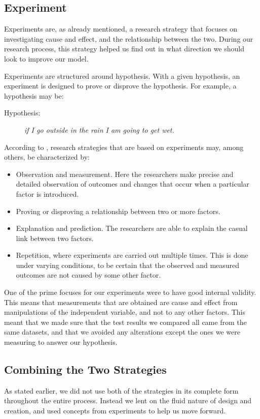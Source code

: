\subsection{Experiment}
\label{sec:experiment}
Experiments are, as already mentioned, a research strategy that focuses on investigating cause and effect, and the relationship between the two. During our research process, this strategy helped us find out in what direction we should look to improve our model.

Experiments are structured around hypothesis. With a given hypothesis, an experiment is designed to prove or disprove the hypothesis. For example, a hypothesis may be:

\begin{description}
    \item[Hypothesis:]{\textit{if I go outside in the rain I am going to get wet.}}
\end{description}

According to \citep{oates2005researching}, research strategies that are based on experiments may, among others, be characterized by:

\begin{itemize}
    \item Observation and measurement. Here the researchers make precise and detailed observation of outcomes and changes that occur when a particular factor is introduced.
    \item Proving or disproving a relationship between two or more factors.
    \item Explanation and prediction. The researchers are able to explain the casual link between two factors.
    \item Repetition, where experiments are carried out multiple times. This is done under varying conditions, to be certain that the observed and measured outcomes are not caused by some other factor.
\end{itemize}

One of the prime focuses for our experiments were to have good internal validity. This means that measurements that are obtained are cause and effect from manipulations of the independent variable, and not to any other factors. This meant that we made sure that the test results we compared all came from the same datasets, and that we avoided any alterations except the ones we were measuring to answer our hypothesis.

\subsection{Combining the Two Strategies}
\label{sec:combining_the_two_strategies}
As stated earlier, we did not use both of the strategies in its complete form throughout the entire process. Instead we lent on the fluid nature of design and creation, and used concepts from experiments to help us move forward. 


